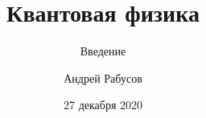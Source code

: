 \documentclass[t,aspectratio=169]{beamer}
\author[А. Рабусов]{Андрей Рабусов}
\title[Квантовая физика]{Квантовая физика}
\subtitle{Введение}
\date{27 декабря 2020}
\begin{document}
\begin{frame}
    \maketitle
\end{frame}
%

\end{document}
